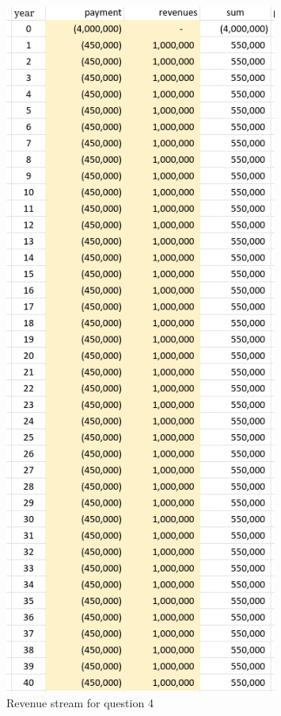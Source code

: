 \documentclass[letterpaper, reqno,11pt]{article}
\begin{document}
\begin{figure}[htpb]
    \centering
    \includegraphics[width=0.8\textwidth]{q4}
    \caption{Revenue stream for question 4}
    \label{fig:q4}
\end{figure}
\end{document}
